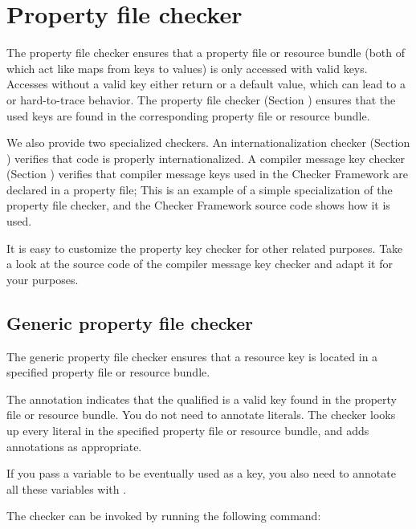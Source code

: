 \htmlhr
\chapter{Property file checker\label{propkey-checker}}

The property file checker ensures that a property file or resource bundle (both
of which act like maps from keys to values) is only accessed with valid keys.
Accesses without a valid key either return  or a default value, which
can lead to a  or hard-to-trace behavior.
The property file checker (Section ) ensures
that the used keys are found in the corresponding property file or resource
bundle.

We also provide two specialized checkers.
An internationalization checker (Section )
verifies that code is properly internationalized.
A compiler message key checker (Section )
verifies that compiler message keys used in the Checker Framework are
declared in a property file;
This is an example of a simple specialization of the property
file checker, and the Checker Framework source code shows how it is used.

It is easy to customize the property key checker for other related purposes.
Take a look at the source code of the compiler message key checker and adapt it for
your purposes.



\section{Generic property file checker\label{genpropkey-checker}}

The generic property file checker ensures that a resource key is located
in a specified property file or resource bundle.


The annotation 
indicates that the qualified  is a valid key
found in the property file or resource bundle.
You do not need to annotate  literals.
The checker looks up every  literal in the specified
property file or resource bundle, and adds annotations as appropriate.

If you pass a  variable to be eventually used as a key, you
also need to annotate all these variables with .


The checker can be invoked by running the following
command:

